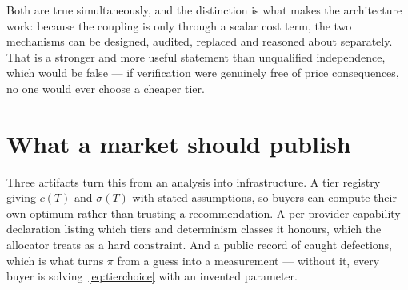 \documentclass[11pt,a4paper]{article}
\begin{document}
Both are true simultaneously, and the distinction is what makes the architecture
work: because the coupling is only through a scalar cost term, the two
mechanisms can be designed, audited, replaced and reasoned about separately.
That is a stronger and more useful statement than unqualified independence,
which would be false --- if verification were genuinely free of price
consequences, no one would ever choose a cheaper tier.

\section{What a market should publish}

Three artifacts turn this from an analysis into infrastructure. A tier registry
giving $c(T)$ and $\sigma(T)$ with stated assumptions, so buyers can compute
their own optimum rather than trusting a recommendation. A per-provider
capability declaration listing which tiers and determinism classes it honours,
which the allocator treats as a hard constraint. And a public record of caught
defections, which is what turns $\pi$ from a guess into a measurement --- without
it, every buyer is solving~\eqref{eq:tierchoice} with an invented parameter.
\end{document}
